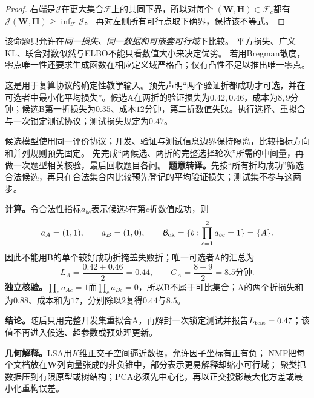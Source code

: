 \begin{proof}
右端是$\mathcal J$在更大集合$\mathcal F$上的共同下界，所以对每个
$(\boldsymbol W,\boldsymbol H)\in\mathcal F_c$都有
$\mathcal J(\boldsymbol W,\boldsymbol H)\ge\inf_{\mathcal F}\mathcal J$。
再对左侧所有可行点取下确界，保持该不等式。
\end{proof}
该命题只允许在\emph{同一损失、同一数据和可嵌套可行域}下比较。
平方损失、广义KL、联合对数似然与ELBO不能只看数值大小来决定优劣。
若用Bregman散度，零点唯一性还要求生成函数在相应定义域严格凸；仅有凸性不足以推出唯一零点。

\begin{example}\label{exm:V5-C08-two-candidate-selection}
这是用于复算协议的确定性教学输入。预先声明“两个验证折都成功才可选，并在可选者中最小化平均损失”。候选A在两折的验证损失为$0.42,0.46$，成本为$8,9$分钟；候选B第一折损失为$0.35$、成本$12$分钟，第二折数值失败。执行选择、重拟合与一次锁定测试协议；测试损失规定为$0.47$。
\end{example}

\begin{solution}
\SolGiven 候选模型使用同一评价协议；开发、验证与测试信息边界保持隔离，比较指标方向和并列规则预先固定。
\SolPlan 先完成“两候选、两折的完整选择轮次”所需的中间量，再做一次题型相关核验，最后回收题目各问。
\SolDerive
\textbf{题意转译。}先按“所有折均成功”筛选合法候选，再只在合法集合内比较预先登记的平均验证损失；测试集不参与这两步。

\textbf{计算。}令合法性指标$a_{bc}$表示候选$b$在第$c$折数值成功，则
\[
a_A=(1,1),\qquad a_B=(1,0),\qquad
\mathcal B_{\rm ok}=\{b:\prod_{c=1}^2a_{bc}=1\}=\{A\}.
\]
因此不能用B的单个较好成功折掩盖失败折；唯一可选者A的汇总为
\[
\overline L_A=\frac{0.42+0.46}{2}=0.44,\qquad
\overline C_A=\frac{8+9}{2}=8.5\text{分钟}.
\]
\textbf{独立核验。}$\prod_ca_{Ac}=1$而$\prod_ca_{Bc}=0$，所以B不属于可比集合；A的两个折损失和为$0.88$、成本和为$17$，分别除以$2$复得$0.44$与$8.5$。

\textbf{结论。}随后只用完整开发集重拟合A，再解封一次锁定测试并报告$L_{\rm test}=0.47$；该值不再进入候选、超参数或预处理更新。
\end{solution}


\label{struct:V5-C08-CH14}
\textbf{几何解释。}LSA用$K$维正交子空间逼近数据，允许因子坐标有正有负；
NMF把每个文档放在$\boldsymbol W$列向量张成的非负锥中，部分表示更易解释却缩小可行域；
聚类把数据压到有限原型或树结构；PCA必须先中心化，再以正交投影最大化方差或最小化重构误差。

